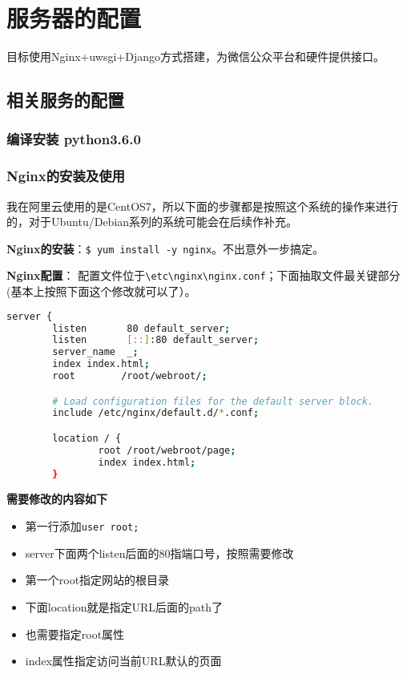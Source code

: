 \documentclass[cyan]{elegantnote}
\author{狼剩子}
\begin{document}
\maketitle
\tableofcontents
\chapter{服务器的配置}
目标使用Nginx+uwsgi+Django方式搭建，为微信公众平台和硬件提供接口。
\section{相关服务的配置}
\subsection{编译安装 python3.6.0}
\subsection{Nginx的安装及使用}

我在阿里云使用的是CentOS7，所以下面的步骤都是按照这个系统的操作来进行的，对于Ubuntu/Debian系列的系统可能会在后续作补充。

\textbf{Nginx的安装}：\verb!$ yum install -y nginx!。不出意外一步搞定。

\textbf{Nginx配置}：
配置文件位于\verb!\etc\nginx\nginx.conf!；下面抽取文件最关键部分(基本上按照下面这个修改就可以了）。
\begin{lstlisting}[language=bash,caption=nginx.conf]
server {
        listen       80 default_server;
        listen       [::]:80 default_server;
        server_name  _;
        index index.html;
        root        /root/webroot/;

        # Load configuration files for the default server block.
        include /etc/nginx/default.d/*.conf;

        location / {
                root /root/webroot/page;
                index index.html;
        }

\end{lstlisting}


\textbf{需要修改的内容如下}
\begin{itemize}
\item 第一行添加\verb!user root;!
\item server下面两个listen后面的80指端口号，按照需要修改
\item 第一个root指定网站的根目录
\item 下面location就是指定URL后面的path了
\item 也需要指定root属性
\item index属性指定访问当前URL默认的页面
\end{itemize}
\end{document}

